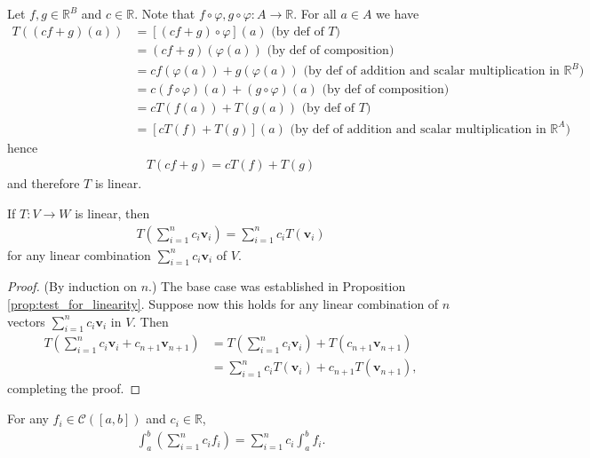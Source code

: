 \documentclass[12pt,letterpaper,reqno]{article}
\numberwithin{equation}{section}
\newcommand{\R}{\ensuremath{\mathbb R}}
\begin{document}
{\color{red}\begin{solution}
	Let $f,g \in \R^B$ and $c \in \mathbb{R}$. Note that $f\circ \varphi, g \circ \varphi:A \to \mathbb{R}$. For all $a \in A$ we have
	\begin{align*}
		T((cf+g)(a))&=[(cf+g)\circ \varphi](a)\text{ (by def of $T$)} \\
		&=(cf+g)(\varphi(a)) \text{ (by def of composition)}\\
		&=cf(\varphi(a))+g(\varphi(a)) \text{ (by def of addition and scalar multiplication in $\R^B$)}\\
		&=c(f \circ \varphi)(a)+(g \circ \varphi)(a) \text{ (by def of composition)}\\
		&=cT(f(a))+T(g(a)) \text{ (by def of $T$)}\\
		&=[cT(f)+T(g)](a)\text{ (by def of addition and scalar multiplication in $\R^A$)}
	\end{align*}
	hence 
	\begin{align*}
		T(cf+g)=cT(f)+T(g)
	\end{align*}
	and therefore $T$ is linear.
\end{solution}}


\begin{prop}\label{prop:linear_maps_preserve_linear_combinations}
	If $T:V \to W$ is linear, then 
	\begin{align*}
		T\left(\sum_{i=1}^nc_i\mathbf{v}_i\right)=\sum_{i=1}^nc_iT(\mathbf{v}_i)
	\end{align*}
	for any linear combination $\sum_{i=1}^nc_i\mathbf{v}_i$ of $V$.
\end{prop}

\begin{proof}
	(By induction on $n$.) The base case was established in Proposition \ref{prop:test_for_linearity}. Suppose now this holds for any linear combination of $n$ vectors $\sum_{i=1}^n c_i\mathbf{v}_i$ in $V$. Then
	\begin{align*}
		T(\sum_{i=1}^n c_i\mathbf{v}_i+c_{n+1}\mathbf{v}_{n+1})&=T(\sum_{i=1}^n c_i\mathbf{v}_i)+T(c_{n+1}\mathbf{v}_{n+1}) \\
		&=\sum_{i=1}^n c_iT(\mathbf{v}_i)+c_{n+1}T(\mathbf{v}_{n+1}),
	\end{align*}
	completing the proof.
\end{proof}

\begin{example}
For any $f_i \in \mathscr{C}([a,b])$ and $c_i \in \mathbb{R}$,
\begin{align*}
	\int_a^b (\sum_{i=1}^n c_if_i)=\sum_{i=1}^nc_i \int_a^b f_i.
\end{align*}	
\end{example}
\end{document}

